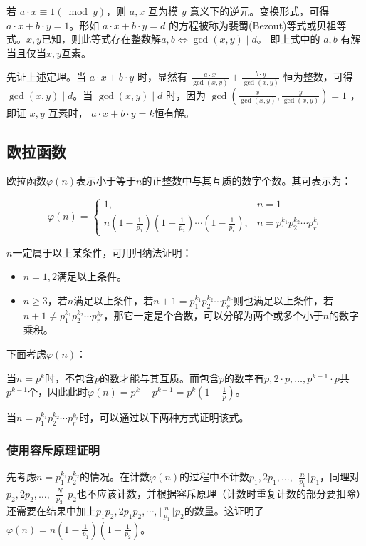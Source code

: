 \documentclass[a4paper]{article}         %
\begin{document}
若 $a \cdot x \equiv 1 (\bmod y)$，则 $a, x$ 互为模 $y$ 意义下的逆元。变换形式，可得$a \cdot x + b \cdot y = 1$。形如 $a \cdot x + b \cdot y = d$ 的方程被称为裴蜀(Bezout)等式或贝祖等式。$x, y$已知，则此等式存在整数解$a, b \iff \gcd(x, y) \mid d$。 即上式中的 $a,b$ 有解当且仅当$x, y$互素。

先证上述定理。当 $a \cdot x + b \cdot y$ 时，显然有 $\frac{a \cdot x}{\gcd(x, y)} + \frac{b \cdot y}{\gcd(x, y)}$ 恒为整数，可得 $\gcd(x, y) \mid d$。当 $\gcd(x, y) \mid d$ 时，因为 $\gcd(\frac{x}{\gcd(x, y)},\frac{y}{\gcd(x, y)}) = 1$ ，即证 $x, y$ 互素时， $a \cdot x + b \cdot y = k$恒有解。

\subsection{欧拉函数}

欧拉函数$\varphi(n)$表示小于等于$n$的正整数中与其互质的数字个数。其可表示为：

\[
	\varphi(n)=\begin{cases}
		1, &n = 1\\
		n(1- \frac{1}{p_1})(1-\frac{1}{p_2}) \cdots (1-\frac{1}{p_r}), &n = p_{1}^{k_1} p_{2}^{k_2} \cdots p_{r}^{k_r}
	\end{cases}
\]

$n$一定属于以上某条件，可用归纳法证明：

\begin{itemize}
	\item $n=1, 2$满足以上条件。
	\item $n \geq 3$，若$n$满足以上条件，若$n+1 = p_{1}^{k_1}p_{2}^{k_2}\cdots p_{r}^{k_r}$则也满足以上条件，若$n+1 \neq p_{1}^{k_1}p_{2}^{k_2}\cdots p_{r}^{k_r}$，那它一定是个合数，可以分解为两个或多个小于$n$的数字乘积。
\end{itemize}

下面考虑$\varphi(n)$：

当$n = p^k$时，不包含$p$的数才能与其互质。而包含$p$的数字有$p,2\cdot p,\ldots ,p^{k-1}\cdot p$共$p^{k-1}$个，因此此时$\varphi(n) = p^k - p^{k-1} = p^k (1 - \frac{1}{p} )$。

当$n = p_{1}^{k_1}p_{2}^{k_2}\cdots p_{r}^{k_r}$时，可以通过以下两种方式证明该式。

\subsubsection{使用容斥原理证明}

\begin{sloppypar}
先考虑$n = p_{1}^{k_1}p_{2}^{k_2}$的情况。在计数$\varphi(n)$的过程中不计数$p_1, 2p_1, \ldots, \lfloor \frac{n}{p_1} \rfloor p_1$，同理对$p_2, 2p_2, \ldots, \lfloor \frac{N}{p_2} \rfloor p_2$也不应该计数，并根据容斥原理（计数时重复计数的部分要扣除）还需要在结果中加上$p_1p_2, 2p_1p_2, \cdots, \lfloor \frac{n}{p_1} \rfloor p_2$的数量。这证明了$\varphi(n)=n(1-\frac{1}{p_1})(1-\frac{1}{p_2})$。
\end{sloppypar}
\end{document}
